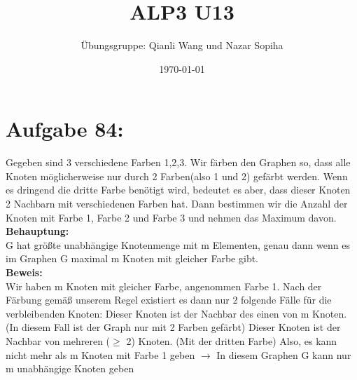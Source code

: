 \documentclass{article}
\title{ALP3 U13}
\author{Übungsgruppe: Qianli Wang und Nazar Sopiha}
\date{\today}
\begin{document}
\maketitle
\section{Aufgabe 84:}
Gegeben sind 3 verschiedene Farben 1,2,3. Wir färben den Graphen so, dass alle Knoten möglicherweise nur durch 2 Farben(also 1 und 2) gefärbt werden. Wenn es dringend die dritte Farbe benötigt wird, bedeutet es aber, dass dieser Knoten 2 Nachbarn mit verschiedenen Farben hat. Dann bestimmen wir die Anzahl der Knoten mit Farbe 1, Farbe 2 und Farbe 3 und nehmen das Maximum davon.\\

\textbf{Behauptung:}\\
G hat größte unabhängige Knotenmenge mit m Elementen, genau dann wenn es im Graphen G maximal m Knoten mit gleicher Farbe gibt.\\

\textbf{Beweis:}\\  
Wir haben m Knoten mit gleicher Farbe, angenommen Farbe 1. Nach der Färbung gemäß unserem Regel existiert es dann nur 2 folgende Fälle für die verbleibenden Knoten:
Dieser Knoten ist der Nachbar des einen von m Knoten. (In diesem Fall ist der Graph nur mit 2 Farben gefärbt)
Dieser Knoten ist der Nachbar von mehreren ($\geq$ 2)  Knoten. (Mit der dritten Farbe)
Also, es kann nicht mehr als m Knoten mit Farbe 1 geben $\rightarrow $ In diesem Graphen G kann nur m unabhängige Knoten geben  
\end{document}
